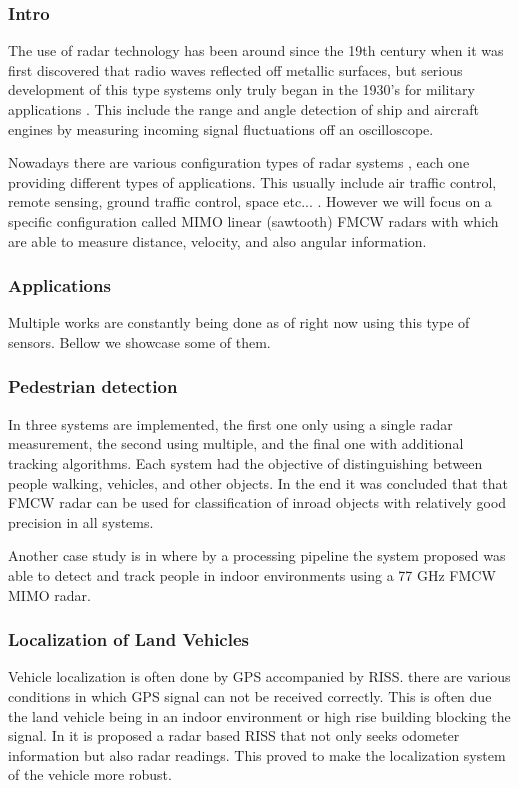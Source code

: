 \subsubsection{Intro}
The use of \ac{radar} technology has been around since the 19th century when it was first discovered that radio waves reflected off metallic surfaces, but serious development of this type systems only truly began in the 1930's for military applications \cite{radar_history}. This include the range and angle detection of ship and aircraft engines by measuring incoming signal fluctuations off an oscilloscope. 

Nowadays there are various configuration types of radar systems  \cite{types_radar}, each one providing different types of applications. This usually include air traffic control, remote sensing, ground traffic control, space etc... .  However we will focus on a specific configuration called \ac{MIMO} linear (sawtooth)  \ac{FMCW} radars with  which are  able to measure distance, velocity, and also angular information. 

\subsubsection{Applications}
Multiple works are constantly being done as of right now using this type of sensors. Bellow we showcase some of them.

  \subsubsection*{Pedestrian detection}  
 In \cite{heuel2010pedestrian} three systems are implemented, the first one only using a single radar measurement, the second using multiple, and the final one with additional tracking algorithms. Each system had the objective of distinguishing between people walking, vehicles, and other objects. In the end it was concluded that that \ac{FMCW} \ac{radar} can be used for classification of inroad objects with relatively good precision in all systems.
  
   Another case study is in \cite{knudde2017indoor} where by a processing pipeline the system proposed was able to detect and track people in indoor environments using a 77 GHz FMCW MIMO radar.
   
 \subsubsection*{Localization of Land Vehicles}  
  Vehicle localization is often done by \ac{GPS} accompanied by \ac{RISS}. there are various conditions in which \ac{GPS} signal can not be received correctly. This is often due the land vehicle being in an indoor environment or high rise building blocking the signal. In \cite{abosekeen2018utilizing} it is proposed a radar based \ac{RISS} that not only seeks odometer information but also radar readings. This proved to make the localization system of the vehicle more robust.
  

